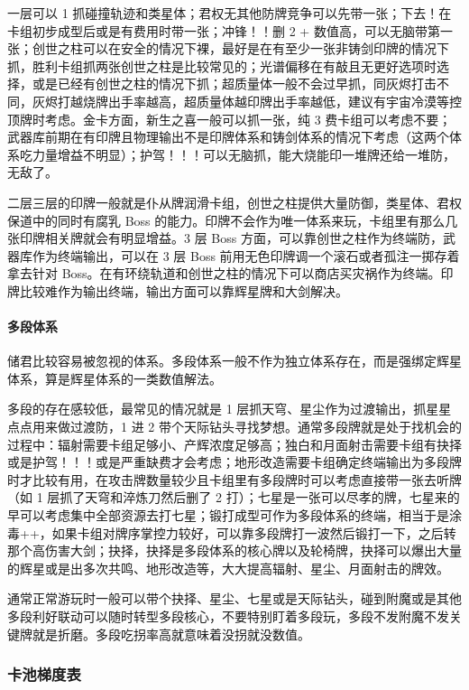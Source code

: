 ﻿\documentclass[12pt, a4paper]{article}
\begin{document}
一层可以 1 抓碰撞轨迹和类星体；君权无其他防牌竞争可以先带一张；下去！在卡组初步成型后或是有费用时带一张；冲锋！！删 2 + 数值高，可以无脑带第一张；创世之柱可以在安全的情况下裸，最好是在有至少一张非铸剑印牌的情况下抓，胜利卡组抓两张创世之柱是比较常见的；光谱偏移在有敲且无更好选项时选择，或是已经有创世之柱的情况下抓；超质量体一般不会过早抓，同灰烬打击不同，灰烬打越烧牌出手率越高，超质量体越印牌出手率越低，建议有宇宙冷漠等控顶牌时考虑。金卡方面，新生之喜一般可以抓一张，纯 3 费卡组可以考虑不要；武器库前期在有印牌且物理输出不是印牌体系和铸剑体系的情况下考虑（这两个体系吃力量增益不明显）；护驾！！！可以无脑抓，能大烧能印一堆牌还给一堆防，无敌了。

二层三层的印牌一般就是仆从牌润滑卡组，创世之柱提供大量防御，类星体、君权保道中的同时有腐乳 Boss 的能力。印牌不会作为唯一体系来玩，卡组里有那么几张印牌相关牌就会有明显增益。3 层 Boss 方面，可以靠创世之柱作为终端防，武器库作为终端输出，可以在 3 层 Boss 前用无色印牌调一个滚石或者孤注一掷存着拿去针对 Boss。在有环绕轨道和创世之柱的情况下可以商店买灾祸作为终端。印牌比较难作为输出终端，输出方面可以靠辉星牌和大剑解决。

\paragraph{多段体系}
储君比较容易被忽视的体系。多段体系一般不作为独立体系存在，而是强绑定辉星体系，算是辉星体系的一类数值解法。

多段的存在感较低，最常见的情况就是 1 层抓天穹、星尘作为过渡输出，抓星星点点用来做过渡防，1 进 2 带个天际钻头寻找梦想。通常多段牌就是处于找机会的过程中：辐射需要卡组足够小、产辉浓度足够高；独白和月面射击需要卡组有抉择或是护驾！！！或是严重缺费才会考虑；地形改造需要卡组确定终端输出为多段牌时才比较有用，在攻击牌数量较少且卡组里有多段牌时可以考虑直接带一张去听牌（如 1 层抓了天穹和淬炼刀然后删了 2 打）；七星是一张可以尽孝的牌，七星来的早可以考虑集中全部资源去打七星；锻打成型可作为多段体系的终端，相当于是涂毒++，如果卡组对牌序掌控力较好，可以靠多段牌打一波然后锻打一下，之后转那个高伤害大剑；抉择，抉择是多段体系的核心牌以及轮椅牌，抉择可以爆出大量的辉星或是出多次共鸣、地形改造等，大大提高辐射、星尘、月面射击的牌效。

通常正常游玩时一般可以带个抉择、星尘、七星或是天际钻头，碰到附魔或是其他多段利好联动可以随时转型多段核心，不要特别盯着多段玩，多段不发附魔不发关键牌就是折磨。多段吃拐率高就意味着没拐就没数值。

\subsubsection{卡池梯度表}
\end{document}
